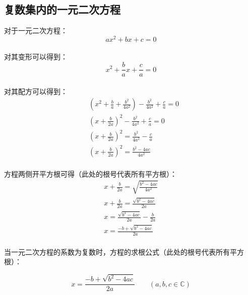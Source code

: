 \documentclass[UTF8]{ctexart}
\begin{document}
\subsection{复数集内的一元二次方程}
    对于一元二次方程：
    \setcounter{equation}{0}
    \begin{equation}
        ax^2+bx+c=0
    \end{equation}\\
    对其变形可以得到：
    \begin{equation}
        x^2+\frac{b}{a}x+\frac{c}{a}=0
    \end{equation}\\
    对其配方可以得到：\vspace{5pt}
    \begin{align}
        &\left(x^2+\frac{b}{a}+\frac{b^2}{4a^2}\right)-\frac{b^2}{4a^2}+\frac{c}{a}=0\\[3mm]
        &\left(x+\frac{b}{2a}\right)^2-\frac{b^2}{4a^2}+\frac{c}{a}=0\\[3mm]
        &\left(x+\frac{b}{2a}\right)^2=\frac{b^2}{4a^2}-\frac{c}{a}\\[3mm]
        &\left(x+\frac{b}{2a}\right)^2=\frac{b^2-4ac}{4a^2}
    \end{align}\\[2mm]
    方程两侧开平方根可得（此处的根号代表所有平方根）：\vspace{5pt}
    \begin{align}
        x+\frac{b}{2a}=\sqrt{\frac{b^2-4ac}{4a^2}}\\[5mm]
        x+\frac{b}{2a}=\frac{\sqrt{b^2-4ac}}{2a}\\[5mm]
        x=\frac{\sqrt{b^2-4ac}}{2a}-\frac{b}{2a}\\[5mm]
        x=\frac{-b+\sqrt{b^2-4ac}}{2a}
    \end{align}\\
    当一元二次方程的系数为复数时，方程的求根公式（此处的根号代表所有平方根）：\vspace{10pt}
    \begin{large}
        \begin{equation*}
            x=\frac{-b+\sqrt{b^2-4ac}}{2a}\qquad(a,b,c\in\mathbb{C})
        \end{equation*}
    \end{large}

\newpage
\end{document}
